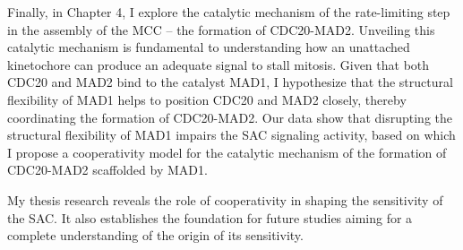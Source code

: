 Finally, in Chapter 4, I explore the catalytic mechanism of the rate-limiting step in the assembly of the MCC -- the formation of CDC20-MAD2. Unveiling this catalytic mechanism is fundamental to understanding how an unattached kinetochore can produce an adequate signal to stall mitosis. Given that both CDC20 and MAD2 bind to the catalyst MAD1, I hypothesize that the structural flexibility of MAD1 helps to position CDC20 and MAD2 closely, thereby coordinating the formation of CDC20-MAD2. Our data show that disrupting the structural flexibility of MAD1 impairs the SAC signaling activity, based on which I propose a cooperativity model for the catalytic mechanism of the formation of CDC20-MAD2 scaffolded by MAD1.

My thesis research reveals the role of cooperativity in shaping the sensitivity of the SAC. It also establishes the foundation for future studies aiming for a complete understanding of the origin of its sensitivity.